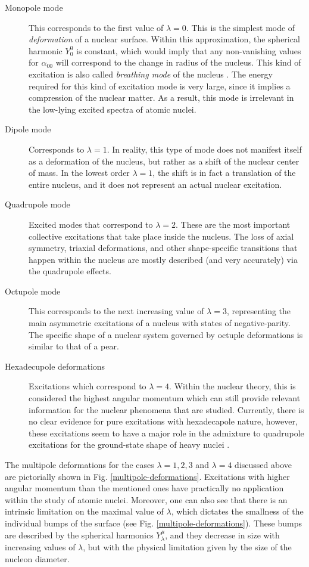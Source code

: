 \begin{description}
    \item[Monopole mode] This corresponds to the first value of $\lambda=0$. This is the simplest mode of \emph{deformation} of a nuclear surface. Within this approximation, the spherical harmonic $Y_0^0$ is constant, which would imply that any non-vanishing values for $\alpha_{00}$ will correspond to the change in radius of the nucleus. This kind of excitation is also called \emph{breathing mode} of the nucleus \cite{greiner1996nuclear,bohr1998nuclear}. The energy required for this kind of excitation mode is very large, since it implies a compression of the nuclear matter. As a result, this mode is irrelevant in the low-lying excited spectra of atomic nuclei.
    \item[Dipole mode] Corresponds to $\lambda=1$. In reality, this type of mode does not manifest itself as a deformation of the nucleus, but rather as a shift of the nuclear center of mass. In the lowest order $\lambda=1$, the shift is in fact a translation of the entire nucleus, and it does not represent an actual nuclear excitation.
    \item[Quadrupole mode] Excited modes that correspond to $\lambda=2$. These are the most important collective excitations that take place inside the nucleus. The loss of axial symmetry, triaxial deformations, and other shape-specific transitions that happen within the nucleus are mostly described (and very accurately) via the quadrupole effects.
    \item[Octupole mode] This corresponds to the next increasing value of $\lambda=3$, representing the main asymmetric excitations of a nucleus with states of negative-parity. The specific shape of a nuclear system governed by octuple deformations is similar to that of a pear.
    \item[Hexadecupole deformations] Excitations which correspond to $\lambda=4$. Within the nuclear theory, this is considered the highest angular momentum which can still provide relevant information for the nuclear phenomena that are studied. Currently, there is no clear evidence for pure excitations with hexadecapole nature, however, these excitations seem to have a major role in the admixture to quadrupole excitations for the ground-state shape of heavy nuclei \cite{greiner1996nuclear}.
\end{description}
The multipole deformations for the cases $\lambda=1,2,3$ and $\lambda=4$ discussed above are pictorially shown in Fig. \ref{multipole-deformations}.
Excitations with higher angular momentum than the mentioned ones have practically no application within the study of atomic nuclei. Moreover, one can also see that there is an intrinsic limitation on the maximal value of $\lambda$, which dictates the smallness of the individual bumps of the surface (see Fig. \ref{multipole-deformations}). These bumps are described by the spherical harmonics $Y_\lambda^\mu$, and they decrease in size with increasing values of $\lambda$, but with the physical limitation given by the size of the nucleon diameter.

